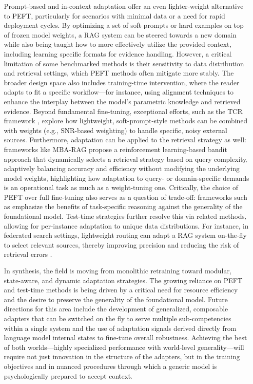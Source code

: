 \documentclass[11pt,a4paper]{article}
\begin{document}
Prompt-based and in-context adaptation offer an even lighter-weight alternative to PEFT, particularly for scenarios with minimal data or a need for rapid deployment cycles. By optimizing a set of soft prompts or hard examples on top of frozen model weights, a RAG system can be steered towards a new domain while also being taught how to more effectively utilize the provided context, including learning specific formats for evidence handling. However, a critical limitation of some benchmarked methods is their sensitivity to data distribution and retrieval settings, which PEFT methods often mitigate more stably. The broader design space also includes training-time intervention, where the reader adapts to fit a specific workflow---for instance, using alignment techniques to enhance the interplay between the model's parametric knowledge and retrieved evidence. Beyond fundamental fine-tuning, exceptional efforts, such as the TCR framework \cite{arxiv:2601.06842v1}, explore how lightweight, soft-prompt-style methods can be combined with weights (e.g., SNR-based weighting) to handle specific, noisy external sources. Furthermore, adaptation can be applied to the retrieval strategy as well: frameworks like MBA-RAG \cite{arxiv:2412.01572v4} propose a reinforcement learning-based bandit approach that dynamically selects a retrieval strategy based on query complexity, adaptively balancing accuracy and efficiency without modifying the underlying model weights, highlighting how adaptation to query- or domain-specific demands is an operational task as much as a weight-tuning one. Critically, the choice of PEFT over full fine-tuning also serves as a question of trade-off: frameworks such as \cite{arxiv:2504.15909v2} emphasize the benefits of task-specific reasoning against the generality of the foundational model. Test-time strategies further resolve this via related methods, allowing for per-instance adaptation to unique data distributions. For instance, in federated search settings, lightweight routing can adapt a RAG system on-the-fly to select relevant sources, thereby improving precision and reducing the risk of retrieval errors \cite{arxiv:2502.19280v2}.

In synthesis, the field is moving from monolithic retraining toward modular, state-aware, and dynamic adaptation strategies. The growing reliance on PEFT and test-time methods is being driven by a critical need for resource efficiency and the desire to preserve the generality of the foundational model. Future directions for this area include the development of generalized, composable adapters that can be switched on the fly to serve multiple sub-competencies within a single system and the use of adaptation signals derived directly from language model internal states to fine-tune overall robustness. Achieving the best of both worlds---highly specialized performance with world-level generality---will require not just innovation in the structure of the adapters, but in the training objectives and in nuanced procedures through which a generic model is psychologically prepared to accept context.
\end{document}
